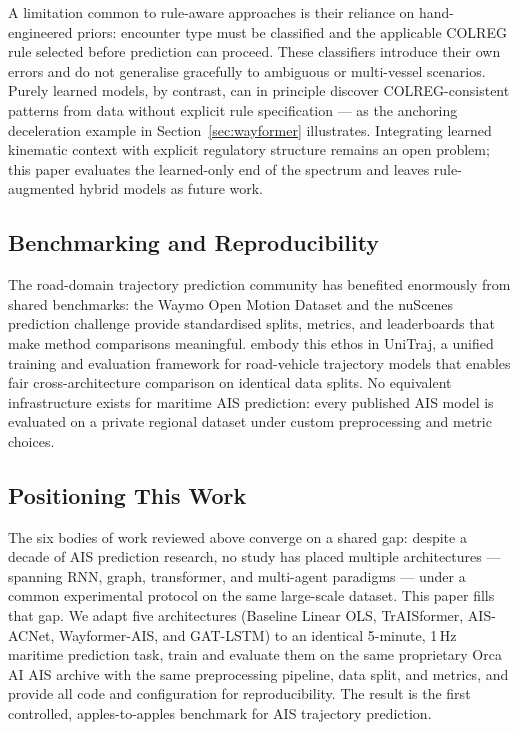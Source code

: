 \documentclass[12pt, a4paper]{article}
\begin{document}
  A limitation common to rule-aware approaches is their reliance on
  hand-engineered priors: encounter type must be classified and the applicable
  COLREG rule selected before prediction can proceed.  These classifiers introduce
  their own errors and do not generalise gracefully to ambiguous or multi-vessel
  scenarios.  Purely learned models, by contrast, can in principle discover
  COLREG-consistent patterns from data without explicit rule specification — as
  the anchoring deceleration example in Section~\ref{sec:wayformer} illustrates.
  Integrating learned kinematic context with explicit regulatory structure remains
  an open problem; this paper evaluates the learned-only end of the spectrum and
  leaves rule-augmented hybrid models as future work.

  \subsection{Benchmarking and Reproducibility}

  The road-domain trajectory prediction community has benefited enormously from
  shared benchmarks: the Waymo Open Motion Dataset and the nuScenes prediction
  challenge provide standardised splits, metrics, and leaderboards that make
  method comparisons meaningful.  \citet{feng2024unitraj} embody this ethos in
  UniTraj, a unified training and evaluation framework for road-vehicle trajectory
  models that enables fair cross-architecture comparison on identical data splits.
  No equivalent infrastructure exists for maritime AIS prediction: every published
  AIS model is evaluated on a private regional dataset under custom preprocessing
  and metric choices.

  \subsection{Positioning This Work}

  The six bodies of work reviewed above converge on a shared gap: despite a decade
  of AIS prediction research, no study has placed multiple architectures —
  spanning RNN, graph, transformer, and multi-agent paradigms — under a common
  experimental protocol on the same large-scale dataset.  This paper fills that
  gap.  We adapt five architectures (Baseline Linear OLS, TrAISformer, AIS-ACNet,
  Wayformer-AIS, and GAT-LSTM) to an identical 5-minute, 1\,Hz maritime prediction
  task, train and evaluate them on the same proprietary Orca AI AIS archive with
  the same preprocessing pipeline, data split, and metrics, and provide all code
  and configuration for reproducibility.  The result is the first controlled,
  apples-to-apples benchmark for AIS trajectory prediction.
\end{document}
